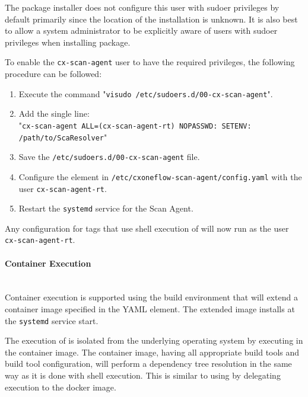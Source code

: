 The package installer does not configure this user with sudoer privileges by default primarily since the location of the \scaresolver
installation is unknown.  It is also best to allow a system administrator to be explicitly aware of users with sudoer privileges when installing
package.

To enable the \texttt{cx-scan-agent} user to have the required privileges, the following procedure can be followed:

\begin{enumerate}
  \item Execute the command "\texttt{visudo /etc/sudoers.d/00-cx-scan-agent}".
  \item Add the single line:\\"\texttt{cx-scan-agent ALL=(cx-scan-agent-rt) NOPASSWD: SETENV: /path/to/ScaResolver}"
  \item Save the \texttt{/etc/sudoers.d/00-cx-scan-agent} file.
  \item Configure the element  in \texttt{/etc/cxoneflow-scan-agent/config.yaml} 
  with the user \texttt{cx-scan-agent-rt}.
  \item Restart the \texttt{systemd} service for the Scan Agent.
\end{enumerate}

Any configuration for tags that use shell execution of \scaresolver will now run as the user\\\texttt{cx-scan-agent-rt}.

\paragraph{Container Execution}
\noindent\\Container execution is supported using the \toolkit build environment that will extend a container image
specified in the  YAML element.  The extended image
installs \scaresolver at the \texttt{systemd} service start.

The execution of \scaresolver is isolated from the underlying operating system by executing in the container image.
The container image, having all appropriate build tools and build tool configuration, will perform a dependency
tree resolution in the same way as it is done with shell execution.  This is similar to using
 by delegating execution to the docker image.

